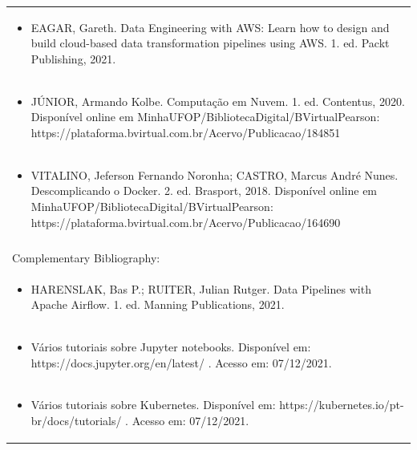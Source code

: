 \documentclass[11pt]{article}
\begin{document}
\begin{center}
\begin{longtable}{|p{4cm}|p{4cm}|p{4cm}|p{4cm}|}
\multicolumn{4}{|p{\dimexpr 16cm + 6\tabcolsep\relax}|}{\begin{itemize}\item EAGAR, Gareth. Data Engineering with AWS: Learn how to design and build cloud-based data transformation pipelines using AWS. 1. ed. Packt Publishing, 2021.\end{itemize}}\\
\multicolumn{4}{|p{\dimexpr 16cm + 6\tabcolsep\relax}|}{\begin{itemize}\item JÚNIOR, Armando Kolbe. Computação em Nuvem. 1. ed. Contentus, 2020. Disponível online em MinhaUFOP/BibliotecaDigital/BVirtualPearson: https://plataforma.bvirtual.com.br/Acervo/Publicacao/184851\end{itemize}}\\
\multicolumn{4}{|p{\dimexpr 16cm + 6\tabcolsep\relax}|}{\begin{itemize}\item VITALINO, Jeferson Fernando Noronha; CASTRO, Marcus André Nunes. Descomplicando o Docker. 2. ed. Brasport, 2018. Disponível online em MinhaUFOP/BibliotecaDigital/BVirtualPearson: https://plataforma.bvirtual.com.br/Acervo/Publicacao/164690\end{itemize}}\\
\multicolumn{4}{|p{16cm}|}{}\\
\hline
\multicolumn{4}{|p{16cm}|}{Complementary Bibliography:}\\*
\multicolumn{4}{|p{\dimexpr 16cm + 6\tabcolsep\relax}|}{\begin{itemize}\item HARENSLAK, Bas P.; RUITER, Julian Rutger. Data Pipelines with Apache Airflow. 1. ed. Manning Publications, 2021.\end{itemize}}\\
\multicolumn{4}{|p{\dimexpr 16cm + 6\tabcolsep\relax}|}{\begin{itemize}\item Vários tutoriais sobre Jupyter notebooks. Disponível em: https://docs.jupyter.org/en/latest/ . Acesso em: 07/12/2021.\end{itemize}}\\
\multicolumn{4}{|p{\dimexpr 16cm + 6\tabcolsep\relax}|}{\begin{itemize}\item Vários tutoriais sobre Kubernetes. Disponível em: https://kubernetes.io/pt-br/docs/tutorials/ . Acesso em: 07/12/2021.\end{itemize}}\\

\end{longtable}
\end{center}
\end{document}
